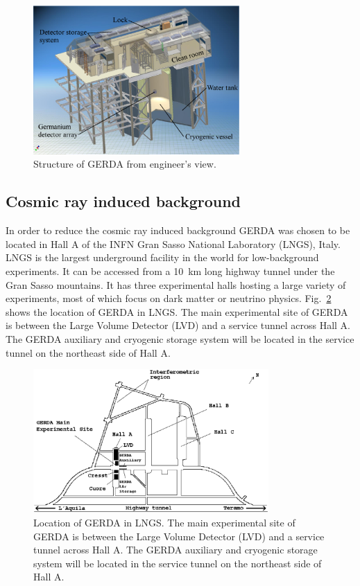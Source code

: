 \begin{figure}[tbhp]
  \centering
  \includegraphics[width=0.7\textwidth]{gerda}  
  \caption{Structure of GERDA from engineer's view.}
  \label{fig:gerda}
\end{figure}

\subsection{Cosmic ray induced background}
\label{sec:gerda:loca}
In order to reduce the cosmic ray induced background GERDA was chosen to be located in Hall A of the INFN Gran Sasso National Laboratory (LNGS), Italy. LNGS is the largest underground facility in the world for low-background experiments. It can be accessed from a 10~km long highway tunnel under the Gran Sasso mountains. It has three experimental halls hosting a large variety of experiments, most of which focus on dark matter or neutrino physics. Fig.~\ref{fig:lngs} shows the location of GERDA in LNGS. The main experimental site of GERDA is between the Large Volume Detector (LVD) and a service tunnel across Hall A. The GERDA auxiliary and cryogenic storage system will be located in the service tunnel on the northeast side of Hall A.

\begin{figure}[tbhp]
  \centering
  \includegraphics[width=0.8\textwidth]{lngs}  
  \caption{Location of GERDA in LNGS. The main experimental site of     GERDA is between the Large Volume Detector (LVD) and a service     tunnel across Hall A. The GERDA auxiliary and cryogenic storage     system will be located in the service tunnel on the northeast side     of Hall A.}
  \label{fig:lngs}
\end{figure}

